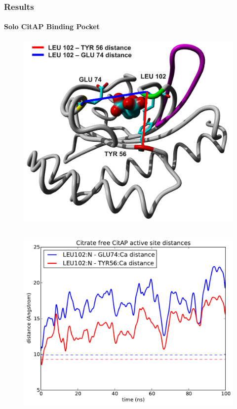\documentclass[english]{beamer}
\begin{document}
\begin{frame}
    \frametitle{Results}
    \framesubtitle{Solo CitAP Binding Pocket}

    \vspace{1.0\topmargin}

    \begin{figure}
        \hspace{0.2\textwidth}
        \includegraphics[width=.4\linewidth]{figures/CitA_pocket2.pdf}
    \end{figure}     

    \vspace{-1.2cm}

    \begin{columns}[t]
        \begin{figure}
            \includegraphics[width=1.0\textwidth]{figures/CitAP_opening/CitAP_dist_free.pdf}
        \end{figure}       


\end{columns}
\end{frame}
\end{document}
